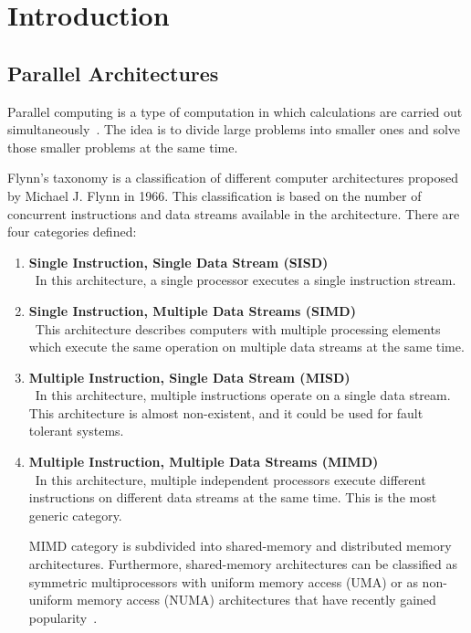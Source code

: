 \chapter{Introduction}
\label{sec:Introduction}

\section{Parallel Architectures}
Parallel computing is a type of computation in which calculations are carried out simultaneously~\cite{Almasi:1989:HPC:160438}. The idea is to divide large problems into smaller ones and solve those smaller problems at the same time.

Flynn's taxonomy is a classification of different computer architectures proposed by Michael J. Flynn in 1966\cite{5009071,44900}. This classification is based on the number of concurrent instructions and data streams available in the architecture.
There are four categories defined:

\begin{enumerate}
  \item \textbf{Single Instruction, Single Data Stream (SISD)}\\\
    In this architecture, a single processor executes a single instruction stream.
  \item \textbf{Single Instruction, Multiple Data Streams (SIMD)}\\\
    This architecture describes computers with multiple processing elements which execute the same operation on multiple data streams at the same time.
  \item \textbf{Multiple Instruction, Single Data Stream (MISD)}\\\
    In this architecture, multiple instructions operate on a single data stream. This architecture is almost non-existent, and it could be used for fault tolerant systems.
  \item \textbf{Multiple Instruction, Multiple Data Streams (MIMD)}\\\
    In this architecture, multiple independent processors execute different instructions on different data streams at the same time. This is the most generic category.
    
    MIMD category is subdivided into shared-memory and distributed memory architectures. Furthermore, shared-memory architectures can be classified as symmetric multiprocessors with uniform memory access (UMA) or as non-uniform memory access (NUMA) architectures that have recently gained popularity~\cite{kshemkalyani2008distributed,sutter2005free}.

\end{enumerate}


